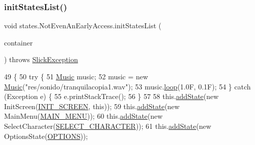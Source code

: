 \subsubsection{\texorpdfstring{init\+States\+List()}{initStatesList()}}
{\footnotesize\ttfamily void states.\+Not\+Even\+An\+Early\+Access.\+init\+States\+List (\begin{DoxyParamCaption}\item[{\mbox{\hyperlink{classorg_1_1newdawn_1_1slick_1_1_game_container}{Game\+Container}}}]{container }\end{DoxyParamCaption}) throws \mbox{\hyperlink{classorg_1_1newdawn_1_1slick_1_1_slick_exception}{Slick\+Exception}}\hspace{0.3cm}{\ttfamily [inline]}}


\begin{DoxyCode}
49                                                                               \{
50         \textcolor{keywordflow}{try} \{
51             \mbox{\hyperlink{classorg_1_1newdawn_1_1slick_1_1_music}{Music}} music;
52             music = \textcolor{keyword}{new} \mbox{\hyperlink{classorg_1_1newdawn_1_1slick_1_1_music}{Music}}(\textcolor{stringliteral}{"res/sonido/tranquilacopia1.wav"});
53             music.\mbox{\hyperlink{classorg_1_1newdawn_1_1slick_1_1_music_aadc35375936c47d7a0e40cd1d719d070}{loop}}(1.0F, 0.1F);
54         \} \textcolor{keywordflow}{catch} (Exception e) \{
55             e.printStackTrace();
56         \}
57 
58         this.\mbox{\hyperlink{classorg_1_1newdawn_1_1slick_1_1state_1_1_state_based_game_acfd4acadb4a4f79fddd7e76250da37dc}{addState}}(\textcolor{keyword}{new} InitScreen(\mbox{\hyperlink{classstates_1_1_not_even_an_early_access_ac99102ff69eb50a2ab5e5179e9b0e051}{INIT\_SCREEN}}, \textcolor{keyword}{this}));
59         this.\mbox{\hyperlink{classorg_1_1newdawn_1_1slick_1_1state_1_1_state_based_game_acfd4acadb4a4f79fddd7e76250da37dc}{addState}}(\textcolor{keyword}{new} MainMenu(\mbox{\hyperlink{classstates_1_1_not_even_an_early_access_a5d36ea9f3991d1e416da183a531c0f3f}{MAIN\_MENU}}));
60         this.\mbox{\hyperlink{classorg_1_1newdawn_1_1slick_1_1state_1_1_state_based_game_acfd4acadb4a4f79fddd7e76250da37dc}{addState}}(\textcolor{keyword}{new} SelectCharacter(\mbox{\hyperlink{classstates_1_1_not_even_an_early_access_a2c58ac815b8ce14c073ede131fcb34a3}{SELECT\_CHARACTER}}));
61         this.\mbox{\hyperlink{classorg_1_1newdawn_1_1slick_1_1state_1_1_state_based_game_acfd4acadb4a4f79fddd7e76250da37dc}{addState}}(\textcolor{keyword}{new} OptionsState(\mbox{\hyperlink{classstates_1_1_not_even_an_early_access_a5e97a3d3df403c050fa07242e19fef32}{OPTIONS}}));

\end{DoxyCode}
